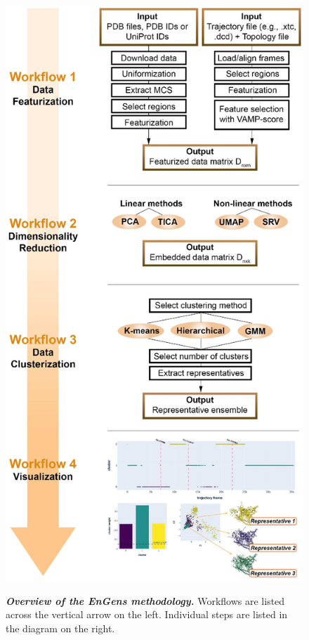 \documentclass[numsec,webpdf,contemporary,large]{oup-authoring-template}
\theoremstyle{thmstyleone}%
\theoremstyle{thmstyletwo}%
\theoremstyle{thmstylethree}%
\begin{document}
\begin{figure}[!t]%
\centering
{\includegraphics[scale=0.7]{Engens_new.eps}}
\caption{\textbf{\textit{ Overview of the EnGens methodology. }} Workflows
are listed across the vertical arrow on the left. Individual steps are listed in the diagram on the right.}
\label{fig-met}
\end{figure}
\end{document}
